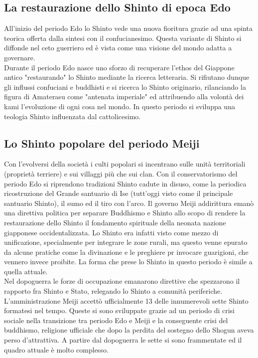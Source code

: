 \documentclass[10pt,a4paper]{report}
\begin{document}
\subsection{La restaurazione dello Shinto di epoca Edo}
All'inizio del periodo Edo lo Shinto vede una nuova fioritura grazie ad una spinta teorica offerta dalla sintesi con il confucianesimo. Questa variante di Shinto si diffonde nel ceto guerriero ed è vista come una visione del mondo adatta a governare.\\
Durante il periodo Edo nasce uno sforzo di recuperare l'ethos del Giappone antico "restaurando" lo Shinto mediante la ricerca letteraria. Si rifiutano dunque gli influssi confuciani e buddhisti e si ricerca lo Shinto originario, rilanciando la figura di Amaterasu come "antenata imperiale" ed attribuendo alla volontà dei kami l'evoluzione di ogni cosa nel mondo. In questo periodo si sviluppa una teologia Shinto influenzata dal cattolicesimo. 
\subsection{Lo Shinto popolare del periodo Meiji}
Con l'evolversi della società i culti popolari si incentrano sulle unità territoriali (proprietà terriere) e sui villaggi più che sui clan. Con il conservatorismo del periodo Edo si riprendono tradizioni Shinto cadute in disuso, come la periodica ricostruzione del Grande santuario di Ise (tutt'oggi visto come il principale santuario Shinto), il sumo ed il tiro con l'arco. Il governo Meiji addirittura emanò una direttiva politica per separare Buddhismo e Shinto allo scopo di rendere la restaurazione dello Shinto il fondamento spirituale della neonata nazione giapponese occidentalizzata. Lo Shinto era infatti visto come mezzo di unificazione, specialmente per integrare le zone rurali, ma questo venne epurato da alcune pratiche come la divinazione e le preghiere pr invocare guarigioni, che vennero invece proibite. La forma che prese lo Shinto in questo periodo è simile a quella attuale.\\
Nel dopoguerra le forze di occupazione emanarono direttive che spezzarono il rapporto fra Shinto e Stato, relegando lo Shinto a comunità periferiche. \\
L'amministrazione Meiji accettò ufficialmente 13 delle innumerevoli sette Shinto formatesi nel tempo. Queste si sono sviluppate grazie ad un periodo di crisi sociale nella transizione tra periodo Edo e Meiji e la conseguente crisi del buddhismo, religione ufficiale che dopo la perdita del sostegno dello Shogun aveva perso d'attrattiva. A partire dal dopoguerra le sette si sono frammentate ed il quadro attuale è molto complesso. 
\end{document}
